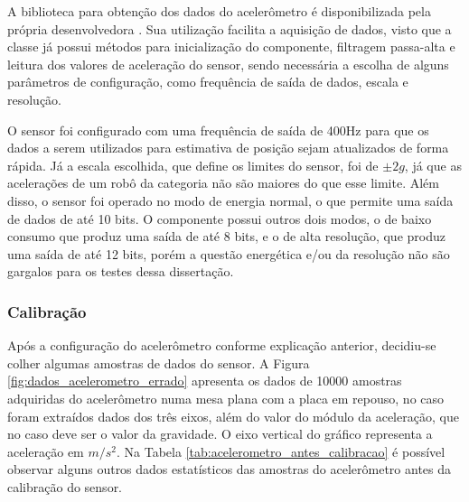 \documentclass[acronym, symbols, table, deposito]{fei}
\begin{document}
	A biblioteca para obtenção dos dados do acelerômetro é disponibilizada pela própria desenvolvedora \cite{accelero_repository}. Sua utilização facilita a aquisição de dados, visto que a classe já possui métodos para inicialização do componente, filtragem passa-alta e leitura dos valores de aceleração do sensor, sendo necessária a escolha de alguns parâmetros de configuração, como frequência de saída de dados, escala e resolução.
	
	O sensor foi configurado com uma frequência de saída de 400Hz para que os dados a serem utilizados para estimativa de posição sejam atualizados de forma rápida. Já a escala escolhida, que define os limites do sensor, foi de $\pm2g$, já que as acelerações de um robô da categoria  não são maiores do que esse limite. Além disso, o sensor foi operado no modo de energia normal, o que permite uma saída de dados de até 10 bits. O componente possui outros dois modos, o de baixo consumo que produz uma saída de até 8 bits, e o de alta resolução, que produz uma saída de até 12 bits, porém a questão energética e/ou da resolução não são gargalos para os testes dessa dissertação.
	
	\subsubsection{Calibração}
	
	Após a configuração do acelerômetro conforme explicação anterior, decidiu-se colher algumas amostras de dados do sensor. A Figura \ref{fig:dados_acelerometro_errado} apresenta os dados de 10000 amostras adquiridas do acelerômetro numa mesa plana com a placa em repouso, no caso foram extraídos dados dos três eixos, além do valor do módulo da aceleração, que no caso deve ser o valor da gravidade. O eixo vertical do gráfico representa a aceleração em $m/s^2$. Na Tabela \ref{tab:acelerometro_antes_calibracao} é possível observar alguns outros dados estatísticos das amostras do acelerômetro antes da calibração do sensor.
	
\end{document}
